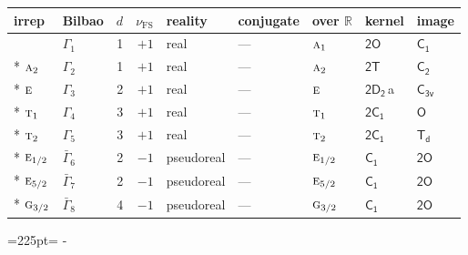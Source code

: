 \documentclass[10pt,a4paper]{article}
\makeatletter
\def\grouprule#1#2{\noalign{\marks\LTgroupmarks{\the\belowrulesep}\nobreak\vskip#1%
  \vskip\aboverulesep}\multispan\LT@cols\unskip{\leaders\hrule\@height#2\hfill\kern\z@}\cr
  \noalign{\penalty\LTrulebreak\vskip\belowrulesep\global\@lastruleclass\z@}}
\newcommand{\needspace}[1]{\par\penalty-100\begingroup\dimen0=#1\relax\dimen2=\pagegoal
  \advance\dimen2-\pagetotal\ifdim\dimen0>\dimen2\relax\ifdim\dimen2>0pt\vfil\break\fi\fi
  \endgroup}
\numberwithin{equation}{section}
\newcommand{\grp}[1]{\mathsf{#1}}
\newcommand{\irr}[1]{\text{\normalfont\scshape #1}}
\newcommand{\detbox}[1]{{\setlength{\fboxsep}{1pt}\fbox{#1}}}
\newcommand{\clsletter}[1]{\,{\scriptsize\color{black!55}#1}}
\newcommand{\fsind}{\nu_{\mathrm{FS}}}
\makeatother
\begin{document}
\setlength{\emergencystretch}{2em}\par\setlength{\emergencystretch}{0pt}
{\small\renewcommand{\arraystretch}{1.25}\setlength{\tabcolsep}{4pt}\begin{longtable}{@{}llrrlllll@{}}\toprule
irrep & Bilbao & $d$ & $\fsind$ & reality & conjugate & over $\mathbb{R}$ & kernel & image\\\midrule\endhead
\bottomrule\endfoot\endlastfoot
\detbox{$\irr{a}_{1}$} & $\Gamma_{1}$ & 1 & $+1$ & real & --- & $\irr{a}_{1}$ & \href{2O.pdf}{$\grp{2O}$} & \href{../../../rotation/data/pdf/C1.pdf}{$\grp{C_{1}}$}\\*
$\irr{a}_{2}$ & $\Gamma_{2}$ & 1 & $+1$ & real & --- & $\irr{a}_{2}$ & \href{2T.pdf}{$\grp{2T}$} & \href{../../../rotation/data/pdf/C2.pdf}{$\grp{C_{2}}$}\\*
$\irr{e}$ & $\Gamma_{3}$ & 2 & $+1$ & real & --- & $\irr{e}$ & \href{2D2.pdf}{$\grp{2D_{2}}$}\clsletter{a} & \href{../../../rotation/data/pdf/C3v.pdf}{$\grp{C_{3v}}$}\\*
$\irr{t}_{1}$ & $\Gamma_{4}$ & 3 & $+1$ & real & --- & $\irr{t}_{1}$ & \href{2C1.pdf}{$\grp{2C_{1}}$} & \href{../../../rotation/data/pdf/O.pdf}{$\grp{O}$}\\*
$\irr{t}_{2}$ & $\Gamma_{5}$ & 3 & $+1$ & real & --- & $\irr{t}_{2}$ & \href{2C1.pdf}{$\grp{2C_{1}}$} & \href{../../../rotation/data/pdf/Td.pdf}{$\grp{T_{d}}$}\\*
\grouprule{0pt}{\lightrulewidth}
$\irr{e}_{1/2}$ & $\bar{\Gamma}_{6}$ & 2 & $-1$ & pseudoreal & --- & $\irr{e}_{1/2}$ & \href{C1.pdf}{$\grp{C_{1}}$} & \href{2O.pdf}{$\grp{2O}$}\\*
$\irr{e}_{5/2}$ & $\bar{\Gamma}_{7}$ & 2 & $-1$ & pseudoreal & --- & $\irr{e}_{5/2}$ & \href{C1.pdf}{$\grp{C_{1}}$} & \href{2O.pdf}{$\grp{2O}$}\\*
$\irr{g}_{3/2}$ & $\bar{\Gamma}_{8}$ & 4 & $-1$ & pseudoreal & --- & $\irr{g}_{3/2}$ & \href{C1.pdf}{$\grp{C_{1}}$} & \href{2O.pdf}{$\grp{2O}$}\\
\bottomrule\end{longtable}}
\needspace{225pt}
\end{document}

